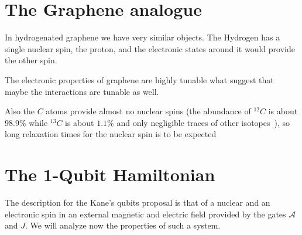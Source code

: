 \section{The Graphene analogue}
In hydrogenated graphene we have very similar objects. The Hydrogen has a single nuclear spin, the proton, and the electronic states around it would provide the other spin.

The electronic properties of graphene are highly tunable what suggest that maybe the interactions are tunable as well.

Also the $C$ atoms provide almost no nuclear spins (the abundance of $^{12}C$ is about $98.9\%$ while $^{13}C$ is about $1.1\%$ and only negligible traces of other isotopes~\cite{iupac}), so long relaxation times for the nuclear spin is to be expected




\section{The 1-Qubit Hamiltonian}
The description for the Kane's qubits proposal is that of a nuclear and an electronic spin in an external magnetic and electric field provided by the gates $\mathcal{A}$ and $J$. We will analyze now the properties of such a system.

